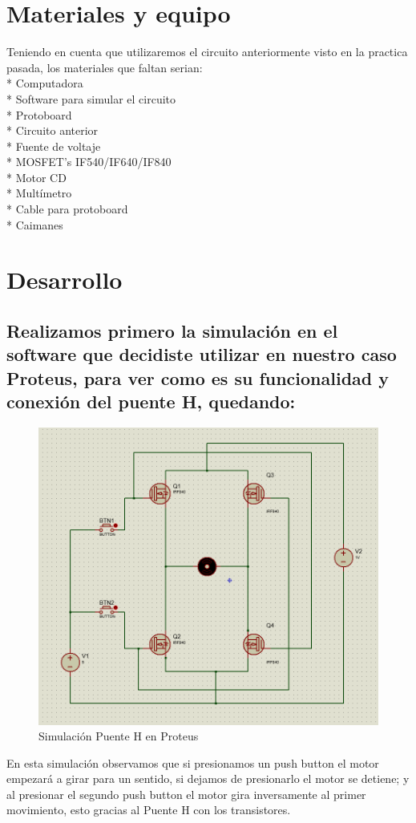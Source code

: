 \documentclass[12pt,a4paper]{article}
\begin{document}
\newpage
\section{Materiales y equipo}
Teniendo en cuenta que utilizaremos el circuito anteriormente visto en la practica pasada, los materiales que faltan serian:\\
* Computadora\\
* Software para simular el circuito\\
* Protoboard \\
* Circuito anterior\\
* Fuente de voltaje\\
* MOSFET's IF540/IF640/IF840\\
* Motor CD\\
* Multímetro\\ 
* Cable para protoboard\\
* Caimanes \\

\newpage
\section{Desarrollo}
\subsection{Realizamos primero la simulación en el software que decidiste utilizar en nuestro caso Proteus, para ver como es su funcionalidad y conexión del puente H, quedando:}
\begin{figure}[hbtp]
\centering
\includegraphics[scale=0.5]{Pictures/Puente.png}
\caption{Simulación Puente H en Proteus}
\end{figure}
En esta simulación observamos que si presionamos un push button el motor empezará a girar para un sentido, si dejamos de presionarlo el motor se detiene; y al presionar el segundo push button el motor gira inversamente al primer movimiento, esto gracias al Puente H con los transistores.
\end{document}
